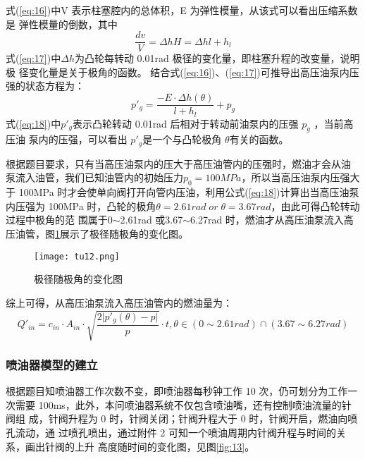 \documentclass{cumcmthesis}
\begin{document}
式(\ref{eq:16})中V 表示柱塞腔内的总体积，E 为弹性模量，从该式可以看出压缩系数是 弹性模量的倒数，其中 
\begin{equation}
\frac{dv}{V}={\Delta h}{H}={\Delta h}{l+h_{l}}\label{eq:17}
\end{equation}
式(\ref{eq:17})中$\Delta h$为凸轮每转动 0.01rad 极径的变化量，即柱塞升程的改变量，说明极 径变化量是关于极角的函数。 结合式(\ref{eq:16})、(\ref{eq:17})可推导出高压油泵内压强的状态方程为：
\begin{equation}
p'_{g}=\frac{-E\cdot \Delta h \left(\theta \right)}{l+h_{l}}+p_{g}\label{eq:18}
\end{equation}
式(\ref{eq:18})中$p'_{g}$表示凸轮转动 0.01rad 后相对于转动前油泵内的压强 $p_{g}$ ，当前高压油 泵内的压强，可以看出 $p'_{g}$是一个与凸轮极角 $\theta$有关的函数。 

根据题目要求，只有当高压油泵内的压大于高压油管内的压强时，燃油才会从油 泵流入油管，我们已知油管内的初始压力$p_{0}=100MPa$，所以当高压油泵内压强大于 100MPa 时才会使单向阀打开向管内压油，利用公式(\ref{eq:18})计算出当高压油泵内压强为 100MPa 时，凸轮的极角$\theta=2.61rad\;or\; \theta=3.67rad$，由此可得凸轮转动过程中极角的范 围属于0$\sim$2.61rad 或3.67$\sim$6.27rad 时，燃油才从高压油泵流入高压油管，图\ref{fig:12}展示了极径随极角的变化图。
 \begin{figure}[htb] \centering 
	
	\texttt{[image: tu12.png]} 
	
	\caption{极径随极角的变化图 } \label{fig:12}
\end{figure}  

综上可得，从高压油泵流入高压油管内的燃油量为： 
\begin{equation}
Q'_{in}=c_{in}\cdot A_{in}\cdot \sqrt{\frac{2\rvert p'_{g}\left(\theta \right)-p\rvert}{p}}\cdot t,\theta \in \left(0\sim 2.61rad\right)\cap \left(3.67\sim 6.27rad\right)\label{eq:19}
\end{equation}

\subsubsection{喷油器模型的建立}
根据题目知喷油器工作次数不变，即喷油器每秒钟工作 10 次，仍可划分为工作一 次需要 100ms，此外，本问喷油器系统不仅包含喷油嘴\textsuperscript{\cite{bib:nine}}，还有控制喷油流量的针阀组 成，针阀升程为 0 时，针阀关闭；针阀升程大于 0 时，针阀开启，燃油向喷孔流动，通 过喷孔喷出，通过附件 2 可知一个喷油周期内针阀升程与时间的关系，画出针阀的上升 高度随时间的变化图，见图\ref{fig:13}。 
\end{document}
